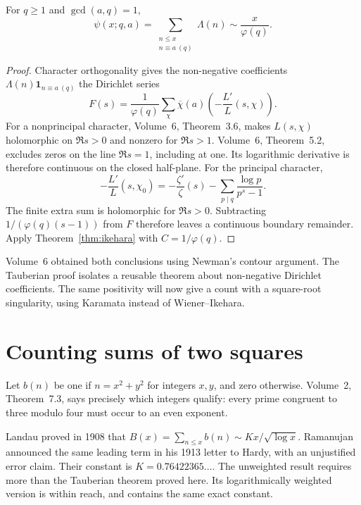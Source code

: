 \begin{corollary}[progressions]\label{cor:pntapikehara}
For $q\ge1$ and $\gcd(a,q)=1$,
\[\psi(x;q,a)=\sum_{\substack{n\le x\\n\equiv a\ (q)}}\Lambda(n)\sim\frac{x}{\varphi(q)}.\]
\end{corollary}
\begin{proof}
Character orthogonality gives the non-negative coefficients $\Lambda(n)\mathbf1_{n\equiv a\ (q)}$ the Dirichlet series
\[F(s)=\frac1{\varphi(q)}\sum_\chi\overline\chi(a)\left(-\frac{L'}L(s,\chi)\right).
\]
For a nonprincipal character, Volume~6, Theorem~3.6, makes $L(s,\chi)$ holomorphic on $\Re s>0$ and nonzero for $\Re s>1$. Volume~6, Theorem~5.2, excludes zeros on the line $\Re s=1$, including at one. Its logarithmic derivative is therefore continuous on the closed half-plane. For the principal character,
\[-\frac{L'}L(s,\chi_0)=-\frac{\zeta'}\zeta(s)-\sum_{p\mid q}\frac{\log p}{p^s-1}.
\]
The finite extra sum is holomorphic for $\Re s>0$. Subtracting $1/(\varphi(q)(s-1))$ from $F$ therefore leaves a continuous boundary remainder. Apply Theorem~\ref{thm:ikehara} with $C=1/\varphi(q)$.
\end{proof}

Volume~6 obtained both conclusions using Newman's contour argument. The Tauberian proof isolates a reusable theorem about non-negative Dirichlet coefficients. The same positivity will now give a count with a square-root singularity, using Karamata instead of Wiener--Ikehara.

\section{Counting sums of two squares}

Let $b(n)$ be one if $n=x^2+y^2$ for integers $x,y$, and zero otherwise. Volume~2, Theorem~7.3, says precisely which integers qualify: every prime congruent to three modulo four must occur to an even exponent.

Landau proved in 1908 that $B(x)=\sum_{n\le x}b(n)\sim Kx/\sqrt{\log x}$. Ramanujan announced the same leading term in his 1913 letter to Hardy, with an unjustified error claim. Their constant is $K=0.76422365\ldots$. The unweighted result requires more than the Tauberian theorem proved here. Its logarithmically weighted version is within reach, and contains the same exact constant.

